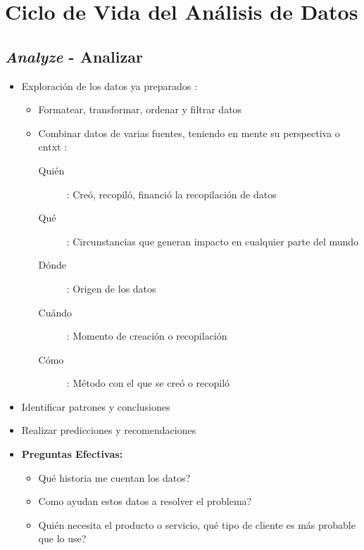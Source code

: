 \section{Ciclo de Vida del Análisis de Datos}



\subsection{\textit{Analyze} - Analizar}
\begin{itemize}
    \item {Exploración de los datos ya preparados :
    \begin{itemize}
        \item {Formatear, transformar, ordenar y filtrar datos}
        \item {Combinar datos de varias fuentes, teniendo en mente su perspectiva o \gls{cntxt} : 
        \begin{description}
            \item[Quién]{ : Creó, recopiló, financió la recopilación de datos}
            \item[Qué]{ : Circunstancias que generan impacto en cualquier parte del mundo}
            \item[Dónde]{ : Origen de los datos}
            \item[Cuándo]{ : Momento de creación o recopilación} 
            \item[Cómo]{ : Método con el que se creó o recopiló} 
        \end{description}}
    \end{itemize}}
    \item {Identificar patrones y conclusiones}
    \item {Realizar predicciones y recomendaciones}
    \item {\textbf{Preguntas Efectivas:}
    \begin{itemize}
        \item {Qué historia me cuentan los datos?}
        \item {Como ayudan estos datos a resolver el problema?}
        \item {Quién necesita el producto o servicio, qué tipo de cliente es más probable que lo use?}
    \end{itemize}}
\end{itemize}

